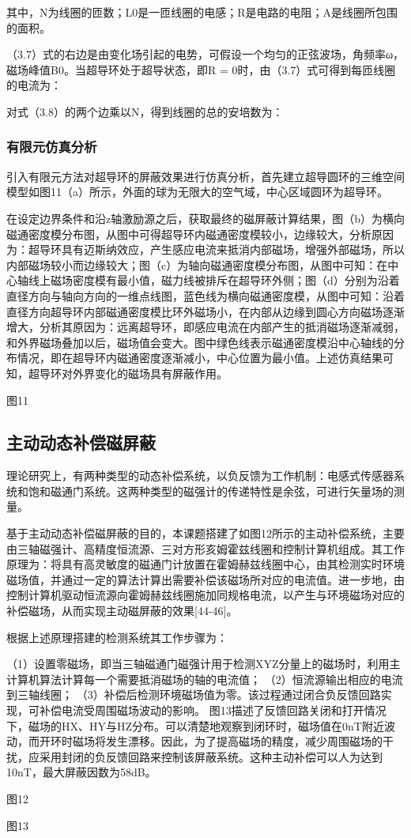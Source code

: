 \documentclass[a4paper,12pt，twoside]{ctexart}
\begin{document}
	其中，N为线圈的匝数；L0是一匝线圈的电感；R是电路的电阻；A是线圈所包围的面积。\par
	（3.7）式的右边是由变化场引起的电势，可假设一个均匀的正弦波场，角频率ω，磁场峰值B0。当超导环处于超导状态，即R = 0时，由（3.7）式可得到每匝线圈的电流为：\par
	
	对式（3.8）的两个边乘以N，得到线圈的总的安培数为：
	
	\subsubsection{有限元仿真分析}
	引入有限元方法对超导环的屏蔽效果进行仿真分析，首先建立超导圆环的三维空间模型如图11（a）所示，外面的球为无限大的空气域，中心区域圆环为超导环。\par
	在设定边界条件和沿z轴激励源之后，获取最终的磁屏蔽计算结果，图（b）为横向磁通密度模分布图，从图中可得超导环内磁通密度模较小，边缘较大，分析原因为：超导环具有迈斯纳效应，产生感应电流来抵消内部磁场，增强外部磁场，所以内部磁场较小而边缘较大；图（c）为轴向磁通密度模分布图，从图中可知：在中心轴线上磁场密度模有最小值，磁力线被排斥在超导环外侧；图（d）分别为沿着直径方向与轴向方向的一维点线图，蓝色线为横向磁通密度模，从图中可知：沿着直径方向超导环内部磁通密度模比环外磁场小，在内部从边缘到圆心方向磁场逐渐增大，分析其原因为：远离超导环，即感应电流在内部产生的抵消磁场逐渐减弱，和外界磁场叠加以后，磁场值会变大。图中绿色线表示磁通密度模沿中心轴线的分布情况，即在超导环内磁通密度逐渐减小，中心位置为最小值。上述仿真结果可知，超导环对外界变化的磁场具有屏蔽作用。\par
	图11\par
	
	
	\subsection{主动动态补偿磁屏蔽}
	理论研究上，有两种类型的动态补偿系统，以负反馈为工作机制：电感式传感器系统和饱和磁通门系统。这两种类型的磁强计的传递特性是余弦，可进行矢量场的测量。\par
	基于主动动态补偿磁屏蔽的目的，本课题搭建了如图12所示的主动补偿系统，主要由三轴磁强计、高精度恒流源、三对方形亥姆霍兹线圈和控制计算机组成。其工作原理为：将具有高灵敏度的磁通门计放置在霍姆赫兹线圈中心，由其检测实时环境磁场值，并通过一定的算法计算出需要补偿该磁场所对应的电流值。进一步地，由控制计算机驱动恒流源向霍姆赫兹线圈施加同规格电流，以产生与环境磁场对应的补偿磁场，从而实现主动磁屏蔽的效果[44-46]。\par
	根据上述原理搭建的检测系统其工作步骤为：\par
	（1）设置零磁场，即当三轴磁通门磁强计用于检测XYZ分量上的磁场时，利用主计算机算法计算每一个需要抵消磁场的轴的电流值；
	（2）恒流源输出相应的电流到三轴线圈；
	（3）补偿后检测环境磁场值为零。该过程通过闭合负反馈回路实现，可补偿电流受周围磁场波动的影响。
	图13描述了反馈回路关闭和打开情况下，磁场的HX、HY与HZ分布。可以清楚地观察到闭环时，磁场值在0nT附近波动，而开环时磁场将发生漂移。因此，为了提高磁场的精度，减少周围磁场的干扰，应采用封闭的负反馈回路来控制该屏蔽系统。这种主动补偿可以人为达到10nT，最大屏蔽因数为58dB。\par
	图12\par
	图13\par
	
\end{document}
